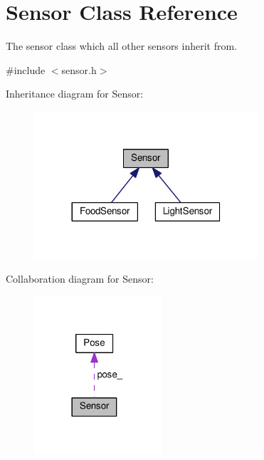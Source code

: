 \hypertarget{classSensor}{}\section{Sensor Class Reference}
\label{classSensor}


The sensor class which all other sensors inherit from.  




{\ttfamily \#include $<$sensor.\+h$>$}



Inheritance diagram for Sensor\+:\nopagebreak
\begin{figure}[H]
\begin{center}
\leavevmode
\includegraphics[width=236pt]{classSensor__inherit__graph}
\end{center}
\end{figure}


Collaboration diagram for Sensor\+:\nopagebreak
\begin{figure}[H]
\begin{center}
\leavevmode
\includegraphics[width=134pt]{classSensor__coll__graph}
\end{center}
\end{figure}
